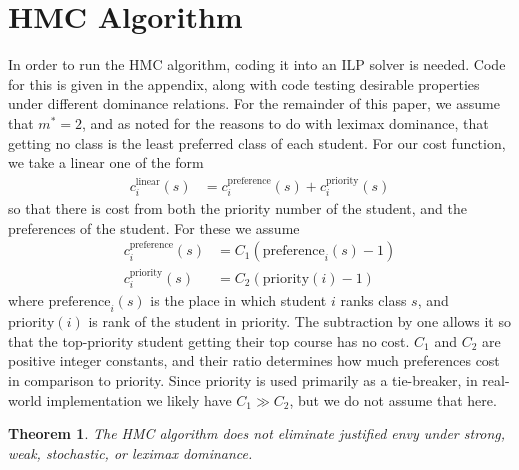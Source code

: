 \documentclass[12pt,letterpaper]{extarticle}
\newtheorem{theo}{Theorem}
\begin{document}
\section{HMC Algorithm}

In order to run the HMC algorithm, coding it into an ILP solver is needed. Code for this is given in the appendix, along with code testing desirable properties under different dominance relations. For the remainder of this paper, we assume that $m^* = 2$, and as noted for the reasons to do with leximax dominance, that getting no class is the least preferred class of each student. For our cost function, we take a linear one of the form
\begin{align*}
    c^{\mathrm{linear}}_i(s) &= c_i^{\mathrm{preference}}(s) + c_i^{\mathrm{priority}}(s)
\end{align*}
so that there is cost from both the priority number of the student, and the preferences of the student. For these we assume
\begin{align*}
    c_i^{\mathrm{preference}}(s) &= C_1 (\mathrm{preference}_i(s)-1) \\
    c_i^{\mathrm{priority}}(s) &= C_2 (\mathrm{priority}(i)-1)
\end{align*}
where $\mathrm{preference}_i(s)$ is the place in which student $i$ ranks class $s$, and $\mathrm{priority}(i)$ is rank of the student in priority. The subtraction by one allows it so that the top-priority student getting their top course has no cost. $C_1$ and $C_2$ are positive integer constants, and their ratio determines how much preferences cost in comparison to priority. Since priority is used primarily as a tie-breaker, in real-world implementation we likely have $C_1 \gg C_2$, but we do not assume that here.

\begin{theo}
The HMC algorithm does not eliminate justified envy under strong, weak, stochastic, or leximax dominance.
\end{theo}
\end{document}
